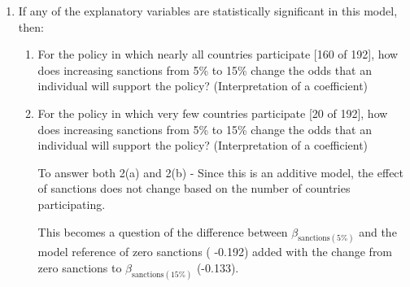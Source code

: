 \documentclass[12pt,letterpaper]{article}
\begin{document}
\begin{enumerate}
\textbf{Countries (participation):} Both coefficients are positive and highly significant. Compared to agreements with only 20 of 192 countries participating, individuals are significantly more likely to support agreements with broader participation. The effect is monotonic — moving from 80 to 160 countries roughly doubles the log-odds increase (0.34 → 0.65), indicating that the more countries join, the stronger the support.


\textbf{Sanctions (enforcement):} The sanction effects are more complicated. Relative to no sanctions, a small sanction of $5\%$ of household costs actually increases support ($\beta = 0.19, p = 0.002$). However, higher sanctions of $15\%$ and $20\%$ decrease support ($\beta = -0.13 and -0.30$ respectively), with the $20\%$ level being negative and highly significant. This suggests people like the idea of some enforcement mechanism, but don't like sanctions they perceive as too costly.


\textbf{Overall conclusion:} The liklihood ratio test confirms that the design features of international climate agreements — specifically the number of participating countries and the severity of sanctions — significantly predict whether individuals will support a given policy. The additive model with these two predictors fits significantly better than an intercept-only model ($p < 0.001$). People favor broad international participation and moderate  sanctions for non-compliance.
	
	\item
	If any of the explanatory variables are statistically significant in this model, then:
	\begin{enumerate}
		\item
		For the policy in which nearly all countries participate [160 of 192], how does increasing sanctions from 5\% to 15\% change the odds that an individual will support the policy? (Interpretation of a coefficient)
		
		\item
		For the policy in which very few countries participate [20 of 192], how does increasing sanctions from 5\% to 15\% change the odds that an individual will support the policy? (Interpretation of a coefficient)
		
	To answer both 2(a) and 2(b) -	Since this is an additive model, the effect of  sanctions does not change based on the number of countries participating.  
	
	This becomes a question of the difference between $\beta_{\text{sanctions}(5\%)}$  and the model reference of zero sanctions ( -0.192) added with the change from zero sanctions to $\beta_{\text{sanctions}(15\%)}$ (-0.133). 
	\vspace{.5cm}
	

\end{enumerate}
\end{enumerate}
\end{document}
